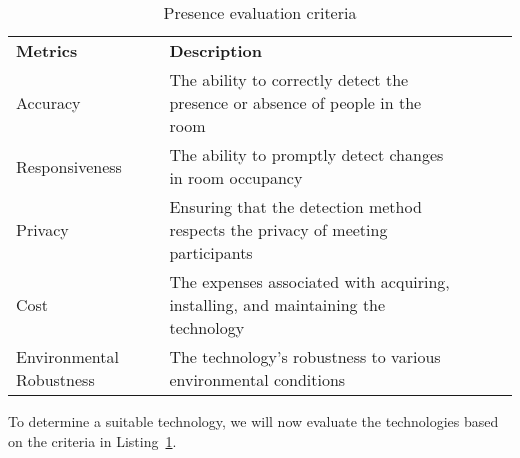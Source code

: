 \begin{table}[]
    \begin{tabular}{|l|p{95mm}|lll}
    \cline{1-2}
    \textbf{Metrics} & \textbf{Description}                                                               &  &  &  \\ \cline{1-2}
    Accuracy         & The ability to correctly detect the presence or absence of people in the room      &  &  &  \\ \cline{1-2}
    Responsiveness   & The ability to promptly detect changes in room occupancy                           &  &  &  \\ \cline{1-2}
    Privacy          & Ensuring that the detection method respects the privacy of meeting participants    &  &  &  \\ \cline{1-2}
    Cost             & The expenses associated with acquiring, installing, and maintaining the technology &  &  &  \\ \cline{1-2}
    Environmental Robustness    & The technology's robustness to various environmental conditions                    &  &  &  \\ \cline{1-2}
    \end{tabular}
    \caption{Presence evaluation criteria}
    \label{lst:presence_eval_criteria}
\end{table}

To determine a suitable technology, we will now evaluate the technologies based on the criteria in Listing~\ref{lst:presence_eval_criteria}.